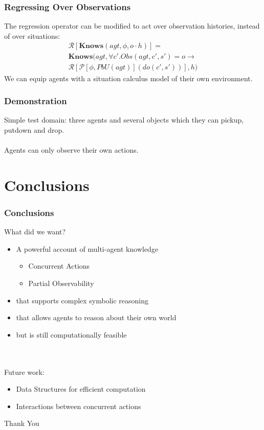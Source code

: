 \documentclass{beamer}
\begin{document}
\begin{frame}
\frametitle{Regressing Over Observations}
The regression operator can be modified to act over observation histories,
instead of over situations:
\begin{multline*}
  \mathcal{R}[\mathbf{Knows}(agt,\phi,o \cdot h)] = \\
  \mathbf{Knows}(agt,\forall c' . Obs(agt,c',s')=o \rightarrow \\
     \mathcal{R}[\mathcal{P}[\phi,PbU(agt)](do(c',s'))],h)
\end{multline*}
We can equip agents with a situation calculus model of their own environment.
\end{frame}

\begin{frame}
\frametitle{Demonstration}
Simple test domain: three agents and several objects which they can pickup,
putdown and drop.
\ \\
\ \\
Agents can only observe their own actions.
\end{frame}

\section{Conclusions}

\begin{frame}
\frametitle{Conclusions}
What did we want?
\begin{itemize}
\item A powerful account of multi-agent knowledge
  \begin{itemize}
  \item Concurrent Actions
  \item Partial Observability
  \end{itemize}
\item that supports complex symbolic reasoning
\item that allows agents to reason about their own world
\item but is still computationally feasible
\end{itemize}
\ \\
\ \\
\pause
Future work:
\begin{itemize}
  \item Data Structures for efficient computation
  \item Interactions between concurrent actions
\end{itemize}

\end{frame}

\begin{frame}
\centering \large Thank You\\
\end{frame}
\end{document}
